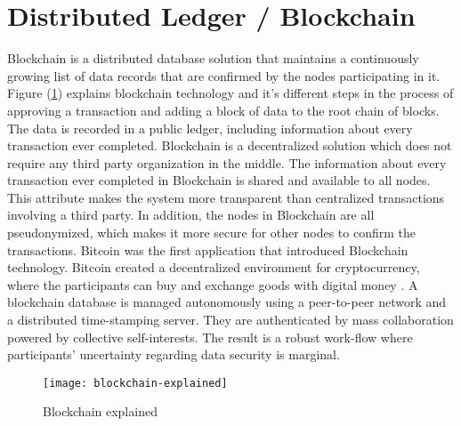 \section{Distributed Ledger / Blockchain}
Blockchain is a distributed database solution that maintains a continuously growing list of data records that are confirmed by the nodes participating in it. Figure (\ref{fig:blockchain}) explains blockchain technology and it's different steps in the process of approving a transaction and adding a block of data to the root chain of blocks. The data is recorded in a public ledger, including information about every transaction ever completed. Blockchain is a decentralized solution which does not require any third party organization in the middle. The information about every transaction ever completed in Blockchain is shared and available to all nodes.
This attribute makes the system more transparent than centralized transactions involving a third party. In addition, the nodes in Blockchain are all pseudonymized, which makes it more secure for other nodes to confirm the transactions. Bitcoin was the first application that introduced Blockchain technology. Bitcoin created a decentralized environment for cryptocurrency, where the participants can buy and exchange goods with digital money \cite{ref-40}. A blockchain database is managed autonomously using a peer-to-peer network and a distributed time-stamping server. They are authenticated by mass collaboration powered by collective self-interests. The result is a robust work-flow where participants' uncertainty regarding data security is marginal.

\vfill
\pagebreak

\begin{figure}[H]
	\centering
	\texttt{[image: blockchain-explained]}
	\caption{Blockchain explained}
	\label{fig:blockchain}
\end{figure}


